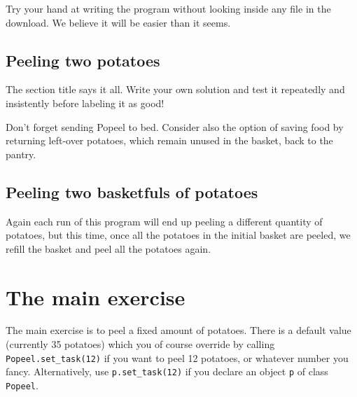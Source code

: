 \documentclass[12pt]{article}
\begin{document}
Try your hand at writing the program without looking
inside any file in the download. We believe it will 
be easier than it seems.

\subsection{Peeling two potatoes}

The section title says it all. 
Write your own solution and test it
repeatedly and insistently before labeling it
as good! 

Don't forget sending Popeel to bed.
Consider also the option of saving food by
returning left-over potatoes, which remain
unused in the basket, back to the pantry.

\subsection{Peeling two basketfuls of potatoes}

Again each run of this program will end up peeling a 
different quantity of potatoes, but this time, once
all the potatoes in the initial basket are peeled,
we refill the basket and peel all the potatoes again.



\section{The main exercise}

The main exercise is to peel a fixed amount of potatoes.
There is a default value (currently 35 potatoes) 
which you of course override by
calling {\tt Popeel.set_task(12)} if you want 
to peel 12 potatoes, or whatever number you fancy. 
Alternatively, use {\tt p.set_task(12)} if
you declare an object {\tt p} of class {\tt Popeel}.
\end{document}
